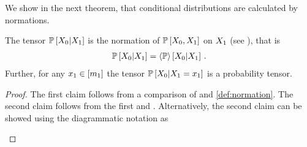 %	

We show in the next theorem, that conditional distributions are calculated by normations.

\begin{theorem}\label{the:conditionalContraction}
	The tensor $\mathbb{P}\left[X_{0}|X_{1}\right]$ is the normation of $\mathbb{P}\left[X_{0},X_{1}\right]$ on $X_{1}$  (see ), that is
	\begin{align*}
		\mathbb{P}\left[X_{0}|X_{1}\right]   
		= \left\langle \mathbb{P}\right\rangle \left[ X_{0} | X_{1} \right] \, . 
	\end{align*}
	Further, for any $x_{1}\in[m_{1}]$ the tensor $\mathbb{P}\left[X_{0}|X_{1}=x_{1}\right]$ is a probability tensor.
\end{theorem}
\begin{proof}
	The first claim follows from a comparison of  and \ref{def:normation}.
	The second claim follows from the first and .
	Alternatively, the second claim can be showed using the diagrammatic notation as
	\begin{center}
		
	\end{center}
\end{proof}



